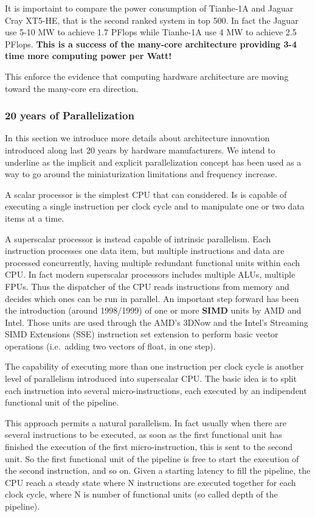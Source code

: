 It is importaint to compare the power consumption of Tianhe-1A and Jaguar Cray XT5-HE, that is the second ranked system in top 500. In fact the
Jaguar use 5-10 MW to achieve 1.7 PFlops while Tianhe-1A use 4 MW to achieve 2.5 PFlops. {\bf This is a success of the many-core architecture providing 3-4 time more computing power per Watt!} 

This enforce the evidence that computing hardware architecture are moving toward the many-core era direction.
\FloatBarrier
\subsubsection{20 years of Parallelization}

In this section we introduce more details about architecture innovation introduced along last 20 years by hardware manufacturers. We intend to underline as the implicit and explicit parallelization concept has been used as a way to go around the miniaturization limitations and frequency increase.


A scalar processor is the simplest CPU that can considered. Is is capable 
of executing a single instruction per clock cycle and to manipulate one or two data items at a time. 

A superscalar processor is instead capable of intrinsic parallelism. Each instruction processes one data item, but multiple instructions and data are  processed concurrently, having multiple redundant functional units within each CPU. In fact modern superscalar processors includes multiple 
ALUs, multiple FPUs. Thus the dispatcher of the CPU reads instructions from memory and decides which ones can be run in parallel. An important step
forward has been the introduction (around 1998/1999)  of one or more {\bf SIMD} units by AMD and Intel. Those units are used through the AMD's 3DNow and the Intel's Streaming SIMD Extensions (SSE) instruction set extension  to perform
basic vector operations (i.e.\ adding two vectors of float, in one step).


The capability of executing more than one instruction per clock cycle is another level of parallelism introduced into superscalar CPU. The basic idea is to split each instruction into several micro-instructions, each executed by an indipendent functional unit of the pipeline.

This approach permits a natural parallelism. In fact usually  when there are
several instructions to be executed, as soon as the first functional unit 
has finished the execution of the first micro-instruction, this is sent to 
the second unit. So the first functional unit of the pipeline is free to start the execution of the second instruction, and so on.
Given a starting latency to fill the pipeline, the CPU reach a steady state where N instructions are executed together for each clock cycle, where N is number of functional units (so called depth of the pipeline).


